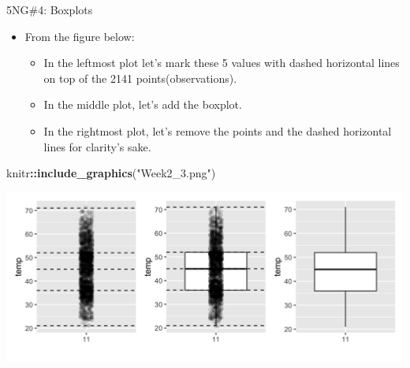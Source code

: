 \documentclass[
  ignorenonframetext,
]{beamer}
\newenvironment{Shaded}{\begin{snugshade}}{\end{snugshade}}
\newcommand{\FunctionTok}[1]{\textcolor[rgb]{0.13,0.29,0.53}{\textbf{#1}}}
\newcommand{\NormalTok}[1]{#1}
\newcommand{\SpecialCharTok}[1]{\textcolor[rgb]{0.81,0.36,0.00}{\textbf{#1}}}
\newcommand{\StringTok}[1]{\textcolor[rgb]{0.31,0.60,0.02}{#1}}
\providecommand{\tightlist}{%
  \setlength{\itemsep}{0pt}\setlength{\parskip}{0pt}}
\begin{document}
\begin{frame}[fragile]{5NG\#4: Boxplots}
\protect\hypertarget{ng4-boxplots-1}{}
\begin{itemize}
\item
  From the figure below:

  \begin{itemize}
  \tightlist
  \item
    In the leftmost plot let's mark these 5 values with dashed
    horizontal lines on top of the 2141 points(observations).
  \item
    In the middle plot, let's add the boxplot.
  \item
    In the rightmost plot, let's remove the points and the dashed
    horizontal lines for clarity's sake.
  \end{itemize}
\end{itemize}

\tiny

\begin{Shaded}
\begin{Highlighting}[]
\NormalTok{knitr}\SpecialCharTok{::}\FunctionTok{include\_graphics}\NormalTok{(}\StringTok{"Week2\_3.png"}\NormalTok{)}
\end{Highlighting}
\end{Shaded}

\begin{center}\includegraphics[width=0.7\linewidth,height=0.5\textheight]{Week2_3} \end{center}
\normalsize
\end{frame}
\end{document}
